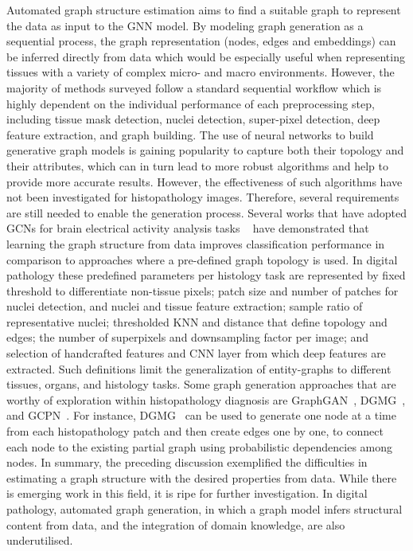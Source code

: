 Automated graph structure estimation aims to find a suitable graph to represent the data as input to the GNN model. 
By modeling graph generation as a sequential process, the graph representation (nodes, edges and embeddings) can be inferred directly from data which would be especially useful when representing tissues with a variety of complex micro- and macro environments. 
However, the majority of methods surveyed follow a standard sequential workflow which is highly dependent on the individual performance of each preprocessing step, including tissue mask detection, nuclei detection, super-pixel detection, deep feature extraction, and graph building. 
The use of neural networks to build generative graph models is gaining popularity to capture both their topology and their attributes, which can in turn lead to more robust algorithms and help to provide more accurate results. However, the effectiveness of such algorithms have not been investigated for histopathology images. Therefore, several requirements are still needed to enable the generation process.
Several works that have adopted GCNs for brain electrical activity analysis tasks {~} have demonstrated that learning the graph structure from data improves classification performance in comparison to approaches where a pre-defined graph topology is used.
In digital pathology these predefined parameters per histology task are represented by fixed threshold to differentiate non-tissue pixels; patch size and number of patches for nuclei detection, and nuclei and tissue feature extraction; sample ratio of representative nuclei; thresholded KNN and distance that define topology and edges; the number of superpixels and downsampling factor per image; and selection of handcrafted features and CNN layer from which deep features are extracted. Such definitions limit the generalization of entity-graphs to different tissues, organs, and histology tasks.
Some graph generation approaches that are worthy of exploration within histopathology diagnosis are GraphGAN~, DGMG~, and GCPN~. For instance, DGMG{~} can be used to generate one node at a time from each histopathology patch and then create edges one by one, to connect each node to the existing partial graph using probabilistic dependencies among nodes.
In summary, the preceding discussion exemplified the difficulties in estimating a graph structure with the desired properties from data. While there is emerging work in this field, it is ripe for further investigation. In digital pathology, automated graph generation, in which a graph model infers structural content from data, and the integration of domain knowledge, are also underutilised.
\vspace{-6pt}

